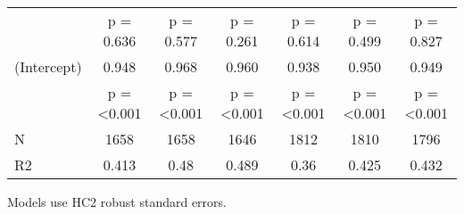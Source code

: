 \begin{table}[!h]
\begin{threeparttable}
{\begin{tabular}[t]{lcccccc}
 & p = \num{0.636} & p = \num{0.577} & p = \num{0.261} & p = \num{0.614} & p = \num{0.499} & p = \num{0.827}\\
(Intercept) & \num{0.948} & \num{0.968} & \num{0.960} & \num{0.938} & \num{0.950} & \num{0.949}\\
 & p = \num{<0.001} & p = \num{<0.001} & p = \num{<0.001} & p = \num{<0.001} & p = \num{<0.001} & p = \num{<0.001}\\
\midrule
N & \num{1658} & \num{1658} & \num{1646} & \num{1812} & \num{1810} & \num{1796}\\
R2 & \num{0.413} & \num{0.48} & \num{0.489} & \num{0.36} & \num{0.425} & \num{0.432}\\
\bottomrule
\end{tabular}}
\begin{tablenotes}
\item Models use HC2 robust standard errors.
\end{tablenotes}
\end{threeparttable}
\end{table}
